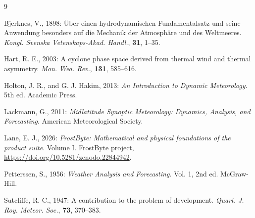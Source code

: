 \documentclass[11pt]{article}
\begin{document}
\begin{thebibliography}{9}
\setlength{\itemsep}{2pt}

Bjerknes, V., 1898: \"Uber einen hydrodynamischen Fundamentalsatz und seine Anwendung besonders auf die Mechanik der Atmosph\"are und des Weltmeeres. \emph{Kongl. Svenska Vetenskaps-Akad. Handl.}, \textbf{31}, 1--35.

Hart, R. E., 2003: A cyclone phase space derived from thermal wind and thermal asymmetry. \emph{Mon. Wea. Rev.}, \textbf{131}, 585--616.

Holton, J. R., and G. J. Hakim, 2013: \emph{An Introduction to Dynamic Meteorology}. 5th ed. Academic Press.

Lackmann, G., 2011: \emph{Midlatitude Synoptic Meteorology: Dynamics, Analysis, and Forecasting}. American Meteorological Society.

Lane, E. J., 2026: \emph{FrostByte: Mathematical and physical foundations of the product suite}. Volume I. FrostByte project, \url{https://doi.org/10.5281/zenodo.22844942}.

Petterssen, S., 1956: \emph{Weather Analysis and Forecasting}. Vol. 1, 2nd ed. McGraw-Hill.

Sutcliffe, R. C., 1947: A contribution to the problem of development. \emph{Quart. J. Roy. Meteor. Soc.}, \textbf{73}, 370--383.

\end{thebibliography}
\end{document}
